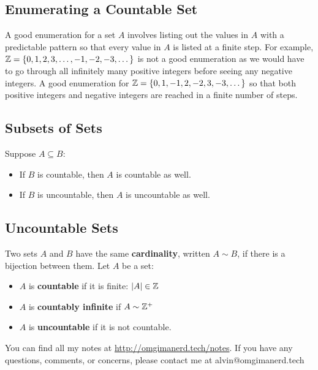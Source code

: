 \documentclass{math}
\begin{document}
\subsection*{Enumerating a Countable Set}
A good enumeration for a set \( A \) involves listing out the values in \( A \)
with a predictable pattern so that every value in \( A \) is listed at a finite
step. For example, \( \mathbb{Z} = \{0,1,2,3,\dots,-1,-2,-3,\dots\} \) is not a good
enumeration as we would have to go through all infinitely many positive
integers before seeing any negative integers. A good enumeration for
\( \mathbb{Z} = \{0,1,-1,2,-2,3,-3,\dots\} \) so that both positive integers and
negative integers are reached in a finite number of steps.

\subsection*{Subsets of Sets}
Suppose \( A\subseteq B \):
\begin{itemize}
  \item If \( B \) is countable, then \( A \) is countable as well.
  \item If \( B \) is uncountable, then \( A \) is uncountable as well.
\end{itemize}

\subsection*{Uncountable Sets}
Two sets \( A \) and \( B \) have the same \textbf{cardinality}, written
\( A\sim B \), if there is a bijection between them.
Let \( A \) be a set:
\begin{itemize}
  \item \( A \) is \textbf{countable} if it is finite: \( |A| \in \mathbb{Z} \)
  \item \( A \) is \textbf{countably infinite} if \( A \sim \mathbb{Z}^{+} \)
  \item \( A \) is \textbf{uncountable} if it is not countable.
\end{itemize}

\begin{center}
  You can find all my notes at \url{http://omgimanerd.tech/notes}. If you have
  any questions, comments, or concerns, please contact me at
  alvin@omgimanerd.tech
\end{center}
\end{document}
